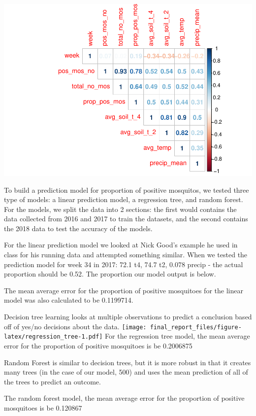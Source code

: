 \documentclass[]{article}
\begin{document}
\includegraphics{final_report_files/figure-latex/correlation_plot-1.pdf}

To build a prediction model for proportion of positive mosquitos, we
tested three type of models: a linear prediction model, a regression
tree, and random forest. For the models, we split the data into 2
sections: the first would contains the data collected from 2016 and 2017
to train the datasets, and the second contains the 2018 data to test the
accuracy of the models.

For the linear prediction model we looked at Nick Good's example he used
in class for his running data and attempted something similar. When we
tested the prediction model for week 34 in 2017: 72.1 t4, 74.7 t2, 0.078
precip - the actual proportion should be 0.52. The proportion our model
output is below.

The mean average error for the proportion of positive mosquitoes for the
linear model was also calculated to be 0.1199714.

Decision tree learning looks at multiple observations to predict a
conclusion based off of yes/no decisions about the data.
\texttt{[image: final\_report\_files/figure-latex/regression\_tree-1.pdf]}
For the regression tree model, the mean average error for the proportion
of positive mosquitoes is be 0.2006875

Random Forest is similar to decision trees, but it is more robust in
that it creates many trees (in the case of our model, 500) and uses the
mean prediction of all of the trees to predict an outcome.

The random forest model, the mean average error for the proportion of
positive mosquitoes is be 0.120867
\end{document}
